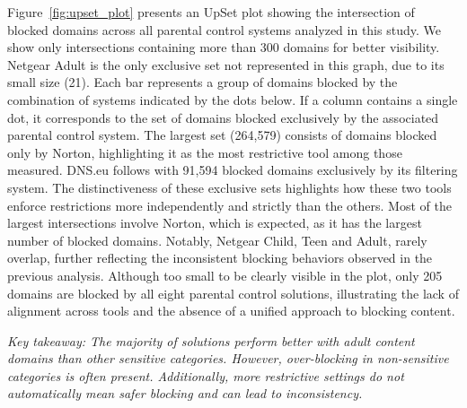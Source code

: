 Figure~\ref{fig:upset_plot} presents an UpSet plot showing the intersection of blocked domains across all parental control systems analyzed in this study. We show only intersections containing more than 300 domains for better visibility. Netgear Adult is the only exclusive set not represented in this graph, due to its small size (21).
Each bar represents a group of domains blocked by the combination of systems indicated by the dots below. If a column contains a single dot, it corresponds to the set of domains blocked exclusively by the associated parental control system.
The largest set (264,579) consists of domains blocked only by Norton, highlighting it as the most restrictive tool among those measured.
DNS.eu follows with 91,594 blocked domains exclusively by its filtering system.
The distinctiveness of these exclusive sets highlights how these two tools enforce restrictions more independently and strictly than the others.
Most of the largest intersections involve Norton, which is expected, as it has the largest number of blocked domains.
Notably, Netgear Child, Teen and Adult, rarely overlap, further reflecting the inconsistent blocking behaviors observed in the previous analysis.
Although too small to be clearly visible in the plot, only 205 domains are blocked by all eight parental control solutions, illustrating the lack of alignment across tools and the absence of a unified approach to blocking content.

\textit{Key takeaway: The majority of solutions perform better with adult content domains than other sensitive categories. However, over-blocking in non-sensitive categories is often present. Additionally, more restrictive settings do not automatically mean safer blocking and can lead to inconsistency.}



